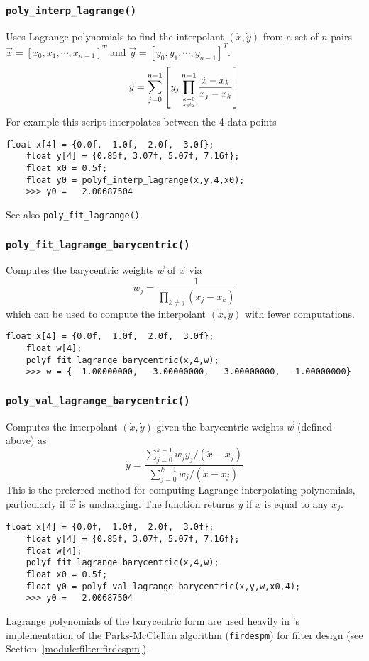 \subsubsection{{\tt poly\_interp\_lagrange()}}
\label{module:math:poly:polyf_interp_lagrange}
Uses Lagrange polynomials to find the interpolant
$(\dot{x},\dot{y})$ from a set of $n$ pairs
$\vec{x}=[x_0,x_1,\cdots,x_{n-1}]^T$ and 
$\vec{y}=[y_0,y_1,\cdots,y_{n-1}]^T$.
\[
    \dot{y} =
        \sum_{j=0}^{n-1} {
            \left[
            y_j
            \prod_{{k=0}\atop{k \ne j}}^{n-1} {
                \frac{\dot{x}-x_k}{x_j-x_k}
            }
            \right]
        }
\]
%
For example this script interpolates between the 4 data points
%
\begin{Verbatim}[fontsize=\small]
    float x[4] = {0.0f,  1.0f,  2.0f,  3.0f};
    float y[4] = {0.85f, 3.07f, 5.07f, 7.16f};
    float x0 = 0.5f;
    float y0 = polyf_interp_lagrange(x,y,4,x0);
    >>> y0 =   2.00687504
\end{Verbatim}
%
See also {\tt poly\_fit\_lagrange()}.

\subsubsection{{\tt poly\_fit\_lagrange\_barycentric()}}
\label{module:math:poly:polyf_fit_lagrange_barycentric}
Computes the barycentric weights $\vec{w}$ of $\vec{x}$ via
\[
    w_j =   \frac{1}{
                \prod_{k \ne j}{\left(x_j - x_k\right)}
            }
\]
which can be used to compute the interpolant $(\dot{x},\dot{y})$
with fewer computations.
%
\begin{Verbatim}[fontsize=\small]
    float x[4] = {0.0f,  1.0f,  2.0f,  3.0f};
    float w[4];
    polyf_fit_lagrange_barycentric(x,4,w);
    >>> w = {  1.00000000,  -3.00000000,   3.00000000,  -1.00000000}
\end{Verbatim}
%

\subsubsection{{\tt poly\_val\_lagrange\_barycentric()}}
\label{module:math:poly:polyf_val_lagrange_barycentric}
Computes the interpolant $(\dot{x},\dot{y})$ given the barycentric
weights $\vec{w}$ (defined above) as
\[
    \dot{y} =   \frac{
                    \sum\limits_{j=0}^{k-1}{ w_j y_j /(\dot{x}-x_j) }
                } {
                    \sum\limits_{j=0}^{k-1}{     w_j /(\dot{x}-x_j) }
                }
\]
This is the preferred method for computing Lagrange interpolating polynomials,
particularly if $\vec{x}$ is unchanging.
The function returns $\dot{y}$ if $\dot{x}$ is equal to any $x_j$.
%
\begin{Verbatim}[fontsize=\small]
    float x[4] = {0.0f,  1.0f,  2.0f,  3.0f};
    float y[4] = {0.85f, 3.07f, 5.07f, 7.16f};
    float w[4]; 
    polyf_fit_lagrange_barycentric(x,4,w);
    float x0 = 0.5f;
    float y0 = polyf_val_lagrange_barycentric(x,y,w,x0,4);
    >>> y0 =   2.00687504
\end{Verbatim}
%
Lagrange polynomials of the barycentric form are used heavily in
\liquid's implementation of the Parks-McClellan algorithm
({\tt firdespm}) for filter design
(see Section~\ref{module:filter:firdespm}).

